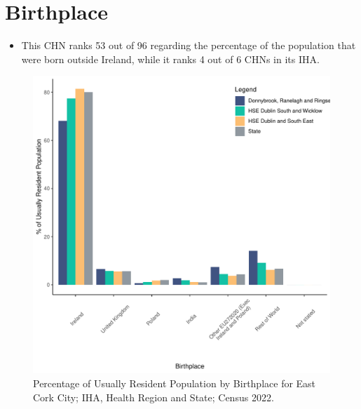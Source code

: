 \documentclass{article}
\begin{document}
\section{Birthplace}\label{sect:Birth}
\begin{itemize}
\item This CHN ranks  53 out of 96 regarding the percentage of the population that were born outside Ireland, while it ranks  4 out of 6 CHNs in its IHA.
\end{itemize}
\begin{figure}[H]
	\centering
	\includegraphics[width = 130mm]{../figures/BirthED.pdf}
	\caption{Percentage of Usually Resident Population by Birthplace for East Cork City; IHA, Health Region and State; Census 2022.}
	\label{fig:vbnv}
	\end{figure}
	
\end{document}
